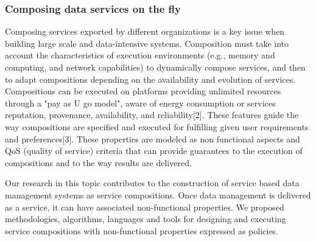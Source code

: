 \subsubsection{Composing data services on the fly }

Composing services  exported by different organizations is a key issue when building  large scale and data-intensive systems. 
Composition must take into account the characteristics of  execution environments (e.g., memory and computing, and network capabilities) to dynamically  compose  services, and then to adapt  compositions depending on the availability and evolution of services. 
 Compositions can be executed  on platforms providing  unlimited resources through a "pay as U go model", aware of energy consumption or services reputation, provenance, availability, and reliability[2].  These features  guide the way compositions are specified and executed for fulfilling given user requirements and preferences[3]. These properties are modeled as  non functional aspects and QoS (quality of service) criteria  that can provide guarantees to the execution of compositions and to the way results are delivered.

Our research in this topic contributes to the construction of service based data management systems as service compositions. Once data management is delivered as a service, it can have associated non-functional properties.
We proposed methodologies, algorithms, languages and tools for designing and executing  service compositions with non-functional properties expressed as policies. 


